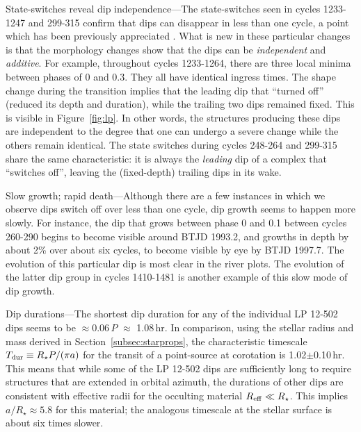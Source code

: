 \documentclass[11pt,twocolumn,tighten]{aastex63}
\begin{document}
{\sc State-switches reveal dip independence}---The state-switches seen
in cycles 1233-1247 and 299-315 confirm that dips can disappear in
less than one cycle, a point which has been previously appreciated
\citep{2017AJ....153..152S}.  What is new in these particular changes
is that the morphology changes show that the dips can be {\it
independent} and {\it additive}.  For example, throughout cycles
1233-1264, there are three local minima between phases of 0 and 0.3.
They all have identical ingress times.  The shape change during the
transition implies that the leading dip that ``turned off'' (reduced
its depth and duration), while the trailing two dips remained fixed.
This is visible in Figure~\ref{fig:lp}.  In other words, the
structures producing these dips are independent to the degree that one
can undergo a severe change while the others remain identical.  The
state switches during cycles 248-264 and 299-315 share the same
characteristic: it is always the {\it leading} dip of a complex that
``switches off'', leaving the (fixed-depth) trailing dips in its wake.

{\sc Slow growth; rapid death}---Although there are a few instances in
which we observe dips switch off over less than one cycle, dip growth
seems to happen more slowly.  For instance, the dip that grows between
phase 0 and 0.1 between cycles 260-290 begins to become visible around
BTJD 1993.2, and growths in depth by about 2\% over about six cycles,
to become visible by eye by BTJD 1997.7.  The evolution of this
particular dip is most clear in the river plots.  The evolution of the
latter dip group in cycles 1410-1481 is another example of this slow
mode of dip growth.


{\sc Dip durations}---The shortest dip duration for any of the
individual LP 12-502 dips seems to be $\approx$0.06\,$P$ $\approx$
1.08\,hr.  In comparison, using the stellar radius and mass derived in
Section~\ref{subsec:starprops}, the characteristic timescale $T_{\rm
dur} \equiv R_\star P / (\pi a)$ for the transit of a point-source at
corotation is 1.02$\pm$0.10\,hr.  This means that while some of the LP
12-502 dips are sufficiently long to require structures that are
extended in orbital azimuth, the durations of other dips are
consistent with effective radii for the occulting material $R_{\rm
eff} \ll R_\star$.  This implies $a/R_\star \approx 5.8$ for this
material; the analogous timescale at the stellar surface is about six
times slower.
\end{document}
